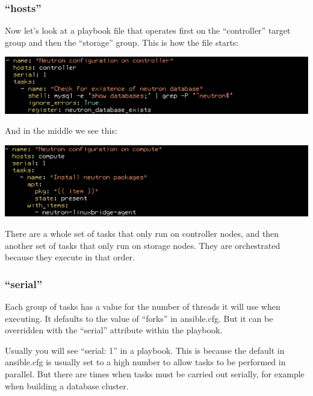 \documentclass[helvetica,english,utf8,notitle,nologo]{beamer}
\begin{document}
\begin{frame}
  \frametitle{``hosts''}

  Now let's look at a playbook file that operates first on the
  ``controller'' target group and then the ``storage'' group. This is
  how the file starts:

  \includegraphics[scale=0.44]{img_26}

  And in the middle we see this:

  \includegraphics[scale=0.44]{img_27}

There are a whole set of tasks that only run on controller nodes, and
then another set of tasks that only run on storage nodes. They are
orchestrated because they execute in that order.
\end{frame}

\begin{frame}
  \frametitle{``serial''}

  Each group of tasks has a value for the number of threads it will use
  when executing. It defaults to the value of ``forks'' in
  ansible.cfg. But it can be overridden with the ``serial'' attribute
  within the playbook.

  Usually you will see ``serial: 1'' in a playbook. This is because
  the default in ansible.cfg is usually set to a high number to allow
  tasks to be performed in parallel. But there are times when tasks
  must be carried out serially, for example when building a database
  cluster.
\end{frame}
\end{document}
